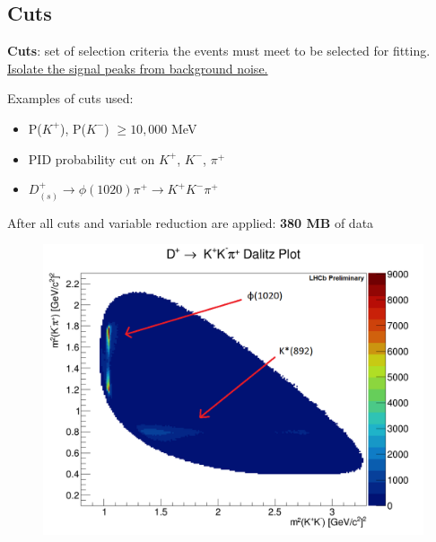 \documentclass{beamer}%
\newif\ifplacelogo %
\begin{document}
\subsection{Cuts}

\begin{frame}
\textbf{Cuts}: set of selection criteria the events must meet to be selected for fitting. \underline{Isolate the signal peaks from background noise.}


\vspace{1.5em}

Examples of cuts used:
\begin{itemize}
\item P($K^+$), P($K^-$) $\geq 10,000$ MeV
\item PID probability cut on $K^+$, $K^-$, $\pi^+$
\item $ D^{+}_{(s)} \rightarrow \phi(1020)\pi^+ \rightarrow K^{+}K^{-}\pi^{+}$
\end{itemize}

\vspace{1.5em}

After all cuts and variable reduction are applied: \textbf{380 MB} of data
\end{frame}




\begin{frame}
\begin{figure}
\includegraphics[width=0.77\linewidth]{dalitz.png}
\end{figure}
\end{frame}



\end{document}
